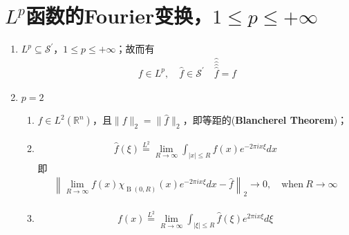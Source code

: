 \section{$L^p$函数的Fourier变换，$1\leqslant p\leqslant +\infty$}
\begin{enumerate}[leftmargin=1cm, label=\arabic*]
    \item $L^p \subseteq \mathcal{S}^{\prime}$，$1\leqslant p\leqslant +\infty$；故而有
    \begin{align*}
        f\in L^p,\quad \widehat{f} \in\mathcal{S}^{\prime} \quad \widehat{\widehat{\widehat{\widehat{f}}}} = f
    \end{align*}
    \item $p=2$
    \begin{enumerate}[leftmargin=1cm, label=(\arabic*)]
        \item $f\in L^2(\mathbb{R}^n)$，且$\|f\|_2 = \|\widehat{f}\|_2$，即等距的(\textbf{Blancherel Theorem})；
        
        \item \begin{align*}
        \widehat{f}(\xi) \overset{L^2}{=} \lim\limits_{R\to \infty} \int_{|x|\leqslant R} f(x) e^{-2\pi i x \xi} dx
    \end{align*}
        即
        \begin{align*}
        \left\| \lim_{R\to\infty} f(x)\chi_{\operatorname{B}(0,R)}(x) e^{-2\pi i x \xi} dx - \widehat{f} \right\|_2 \to 0,\quad\text{when}\ R\to\infty
    \end{align*}

    \item 
    \begin{align*}
        f(x) \overset{L^2}{=} \lim\limits_{R\to\infty} \int_{|\xi|\leqslant R} \widehat{f}(\xi) e^{2\pi i x \xi} d\xi
    \end{align*}
    \end{enumerate}
    
    
    
\end{enumerate}
